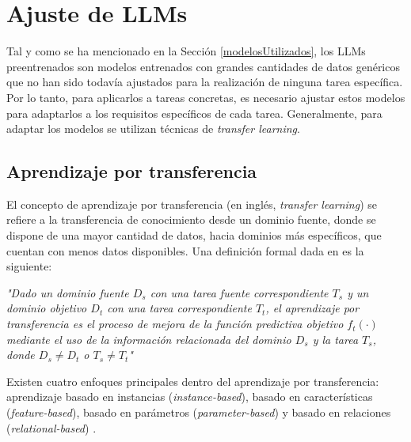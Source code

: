 \documentclass[11pt,spanish,listoffigures,listoftables]{tfgetsinf}
\begin{document}
\section{Ajuste de LLMs}

Tal y como se ha mencionado en la Sección \ref{modelosUtilizados}, los LLMs preentrenados son modelos entrenados con grandes cantidades de datos genéricos que no han sido todavía ajustados para la realización de ninguna tarea específica. Por lo tanto, para aplicarlos a tareas concretas, es necesario ajustar estos modelos para adaptarlos a los requisitos específicos de cada tarea. Generalmente, para adaptar los modelos se utilizan técnicas de \textit{transfer learning}.

\subsection{Aprendizaje por transferencia}

El concepto de aprendizaje por transferencia (en inglés, \textit{transfer learning}) se refiere a la transferencia de conocimiento desde un dominio fuente, donde se dispone de una mayor cantidad de datos, hacia dominios más específicos, que cuentan con menos datos disponibles. Una definición formal dada en \cite{Weiss2016} es la siguiente:

\begin{displayquote}
\textit{"Dado un dominio fuente $D_s$ con una tarea fuente correspondiente $T_s$ y un dominio objetivo $D_t$ con una tarea correspondiente $T_t$, el aprendizaje por transferencia es el proceso de mejora de la función predictiva objetivo $f_t(\cdot)$ mediante el uso de la información relacionada del dominio $D_s$ y la tarea $T_s$, donde $D_s \neq D_t$ o $T_s \neq T_t$"}
\end{displayquote}

Existen cuatro enfoques principales dentro del aprendizaje por transferencia: aprendizaje basado en instancias (\textit{instance-based}), basado en características (\textit{feature-based}), basado en parámetros (\textit{parameter-based}) y basado en relaciones (\textit{relational-based}) \cite{Weiss2016}.
\end{document}
